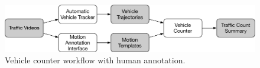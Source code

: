 \begin{figure}
\centering
\includegraphics[width=\linewidth]{./img/system/kf-counter.pdf}
\caption{Vehicle counter workflow with human annotation.}
\label{fig:kf-counter}
\end{figure}